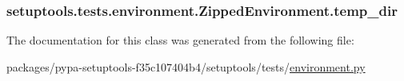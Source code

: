 \subsubsection[{temp\+\_\+dir}]{\setlength{\rightskip}{0pt plus 5cm}setuptools.\+tests.\+environment.\+Zipped\+Environment.\+temp\+\_\+dir}\label{classsetuptools_1_1tests_1_1environment_1_1ZippedEnvironment_ad6e411779c720348b87560aa1121c238}


The documentation for this class was generated from the following file\+:\begin{DoxyCompactItemize}
\item 
packages/pypa-\/setuptools-\/f35c107404b4/setuptools/tests/\hyperlink{environment_8py}{environment.\+py}\end{DoxyCompactItemize}
